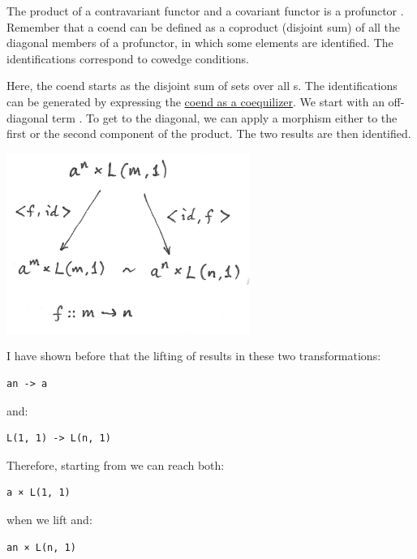 The product of a contravariant functor  and a covariant
functor  is a profunctor
. Remember that a coend can be defined
as a coproduct (disjoint sum) of all the diagonal members of a
profunctor, in which some elements are identified. The identifications
correspond to cowedge conditions.

Here, the coend starts as the disjoint sum of sets
 over all s. The identifications can
be generated by expressing the
\href{https://bartoszmilewski.com/2017/03/29/ends-and-coends/}{coend as
a coequilizer}. We start with an off-diagonal term
. To get to the diagonal, we can apply a
morphism  either to the first or
the second component of the product. The two results are then
identified.

\includegraphics[width=3.12500in]{images/equalize1.png}

I have shown before that the lifting of
 results in these two
transformations:

\begin{verbatim}
an -> a
\end{verbatim}

and:

\begin{verbatim}
L(1, 1) -> L(n, 1)
\end{verbatim}

Therefore, starting from  we can reach both:

\begin{verbatim}
a × L(1, 1)
\end{verbatim}

when we lift  and:

\begin{verbatim}
an × L(n, 1)
\end{verbatim}

